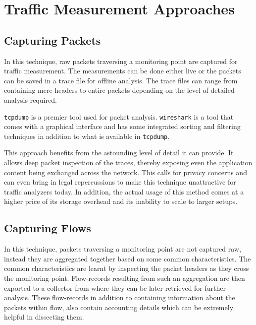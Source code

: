 \chapter{Traffic Measurement Approaches}\label{ch:traffic-measurement-approaches}

\section{Capturing Packets}\label{sec:capturing-packets}
In this technique, raw packets traversing a monitoring point are captured for traffic measurement. The measurements can be done either live or the packets can be saved in a trace file for offline analysis. The trace files can range from containing mere headers to entire packets depending on the level of detailed analysis required. 

\texttt{tcpdump} \cite{...} is a premier tool used for packet analysis. \texttt{wireshark} \cite{...} is a  tool that comes with a graphical interface and has some integrated sorting and filtering techniques in addition to what is available in \texttt{tcpdump}. 

This approach benefits from the astounding level of detail it can provide. It allows deep packet inspection of the traces, thereby exposing even the application content being exchanged  across the network. This calls for privacy concerns and can even bring in legal repercussions to make this technique unattractive for traffic analyzers today. In addition, the actual usage of this method comes at a higher price of its storage overhead and its inability to scale to larger setups.



\section{Capturing Flows}\label{sec:capturing-flows}
In this technique, packets traversing a monitoring point are not captured raw, instead they are aggregated together based on some common characteristics. The common characteristics are learnt by inspecting the packet headers as they cross the monitoring point. Flow-records resulting from such an aggregation are then exported to a collector from where they can be later retrieved for further analysis. These flow-records in addition to containing information about the packets within flow, also contain accounting details which can be extremely helpful in dissecting them. 


